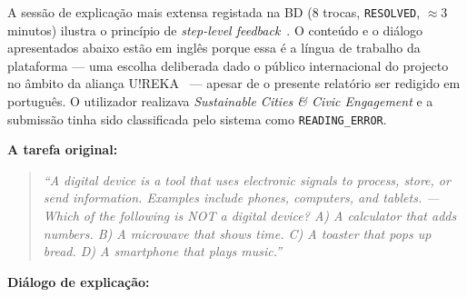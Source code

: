 A sessão de explicação mais extensa registada na BD (8 trocas, \texttt{RESOLVED}, $\approx$3 minutos) ilustra o princípio de \emph{step-level feedback}~\cite{vanlehn2011relative}. O conteúdo e o diálogo apresentados abaixo estão em inglês porque essa é a língua de trabalho da plataforma --- uma escolha deliberada dado o público internacional do projecto no âmbito da aliança U!REKA~\citep{ureka2026alliance} --- apesar de o presente relatório ser redigido em português. O utilizador realizava \emph{Sustainable Cities \& Civic Engagement} e a submissão tinha sido classificada pelo sistema como \texttt{READING\_ERROR}.

\medskip
\noindent\textbf{A tarefa original:}
\begin{quote}
\small\itshape
\emph{``A digital device is a tool that uses electronic signals to process, store, or send information. Examples include phones, computers, and tablets. --- Which of the following is NOT a digital device? A) A calculator that adds numbers. B) A microwave that shows time. C) A toaster that pops up bread. D) A smartphone that plays music.''}
\end{quote}

\smallskip
\noindent\textbf{Diálogo de explicação:}

